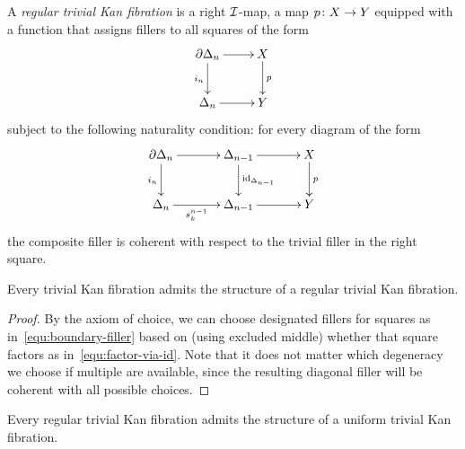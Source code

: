\documentclass[reqno,10pt,a4paper,oneside,draft]{amsart}
\begin{document}
\begin{definition}
A \emph{regular trivial Kan fibration} is a right $\cal{I}$-map, \ie a map $p \co X \to Y$ equipped with a function that assigns fillers to all squares of the form
\begin{equation} \label{equ:boundary-filler}
\xycenter{
  \partial \Delta_n \ar[d]_{i_n} \ar[r] & X \ar[d]^{p} \\
  \Delta_n \ar[r] & Y
}
\end{equation}
subject to the following naturality condition: for every diagram of the form
\begin{equation} \label{equ:factor-via-id}
\begin{gathered}
\xymatrix@C=1.2cm{
  \partial \Delta_n
  \ar[r]
  \ar[d]_{i_n}
&
  \Delta_{n-1}
  \ar[r]
  \ar[d]^{\id_{\Delta_{n-1}}}
&
  X
  \ar[d]^{p}
\\
  \Delta_n
  \ar[r]_-{s_k^{n-1}}
&
  \Delta_{n-1}
  \ar[r]
&
  Y
}
\end{gathered}
\end{equation}
the composite filler is coherent with respect to the trivial filler in the right square.
\end{definition}

\begin{lemma}[ZFC] \label{triv-Kan-is-regular}
Every trivial Kan fibration admits the structure of a regular trivial Kan fibration.
\end{lemma}

\begin{proof}
By the axiom of choice, we can choose designated fillers for squares as in~\eqref{equ:boundary-filler} based on (using excluded middle) whether that square factors as in~\eqref{equ:factor-via-id}.
Note that it does not matter which degeneracy we choose if multiple are available, since the resulting diagonal filler will be coherent with all possible choices.
\end{proof}

\begin{lemma} \label{reg-triv-is-unif-Kan}
Every regular trivial Kan fibration admits the structure of a uniform trivial Kan fibration.
\end{lemma}
\end{document}
